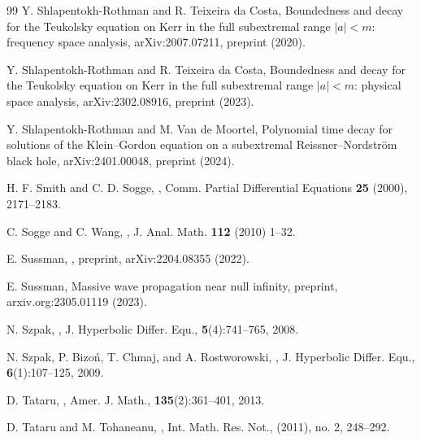 \documentclass[10pt,a4paper,reqno]{amsart}
\theoremstyle{definition}
\theoremstyle{remark}
\numberwithin{equation}{section}
\begin{document}
\begin{thebibliography}{99}
 Y. Shlapentokh-Rothman and R. Teixeira da Costa,
\newblock Boundedness and decay for the Teukolsky equation on Kerr in the full subextremal range $|a| < m$: frequency space analysis,
\newblock arXiv:2007.07211, preprint (2020).

 Y. Shlapentokh-Rothman and R. Teixeira da Costa,
\newblock Boundedness and decay for the Teukolsky equation on Kerr in the full subextremal range $|a| < m$: physical space analysis,
\newblock arXiv:2302.08916, preprint (2023).

 Y. Shlapentokh-Rothman and M. Van de Moortel,
\newblock Polynomial time decay for solutions of the Klein–Gordon equation on a subextremal Reissner–Nordström black hole,
\newblock arXiv:2401.00048, preprint (2024).

 H. F. Smith and C. D. Sogge,
,
\newblock Comm. Partial Differential Equations \textbf{25} (2000), 2171--2183.

 C. Sogge and C. Wang,
,
\newblock J. Anal. Math. \textbf{112} (2010) 1--32.%

 E. Sussman, 
,
\newblock preprint, arXiv:2204.08355 (2022).%

 E. Sussman,
\newblock Massive wave propagation near null infinity,
\newblock preprint, arxiv.org:2305.01119 (2023).

 N. Szpak, 
,
\newblock J. Hyperbolic Differ. Equ., \textbf{5}(4):741--765, 2008.%

 N. Szpak, P. Bizoń, T. Chmaj, and A. Rostworowski, 
,
\newblock J. Hyperbolic Differ. Equ., \textbf{6}(1):107--125, 2009. %

 D. Tataru, 
,
\newblock Amer. J. Math., \textbf{135}(2):361--401, 2013. %

 D. Tataru and M. Tohaneanu,
,
\newblock Int. Math. Res. Not., (2011), no. 2, 248--292. %


\end{thebibliography}
\end{document}
